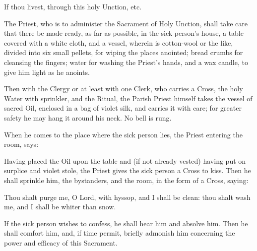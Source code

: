 If thou livest, through this holy {} Unction, etc.
\begin{rubric}
    The Priest, who is to administer the Sacrament of Holy Unction, shall take care that there be made ready, as far as possible, in the sick person's house, a table covered with a white cloth, and a vessel, wherein is cotton-wool or the like, divided into six small pellets, for wiping the places anointed; bread crumbs for cleansing the fingers; water for washing the Priest's hands, and a wax candle, to give him light as he anoints.
\end{rubric}
\begin{rubric}
    Then with the Clergy or at least with one Clerk, who carries a Cross, the holy Water with sprinkler, and the Ritual, the Parish Priest himself takes the vessel of sacred Oil, enclosed in a bag of violet silk, and carries it with care; for greater safety he may hang it around his neck. No bell is rung.
\end{rubric}
\begin{rubric}
    When he comes to the place where the sick person lies, the Priest entering the room, says:
\end{rubric}



\begin{rubric}
    Having placed the Oil upon the table and (if not already vested) having put on surplice and violet stole, the Priest gives the sick person a Cross to kiss. Then he shall sprinkle him, the bystanders, and the room, in the form of a Cross, saying:
\end{rubric}\par\noindent
Thou shalt purge me, O Lord, with hyssop, and I shall be clean: thou shalt wash me, and I shall be whiter than snow.
\begin{rubric}
    If the sick person wishes to confess, he shall hear him and absolve him. Then he shall comfort him, and, if time permit, briefly admonish him concerning the power and efficacy of this Sacrament.
\end{rubric}




